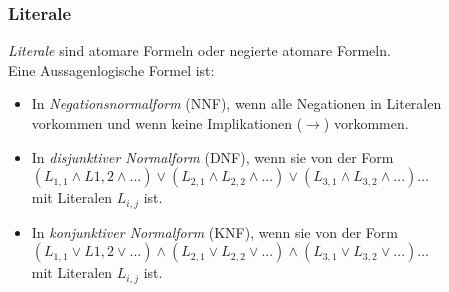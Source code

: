 \subsubsection{Literale}%
\label{ssub:literale}
\begin{minipage}{0.9\linewidth}
\textit{Literale} sind atomare Formeln oder negierte atomare Formeln. \\
Eine Aussagenlogische Formel ist:
\begin{itemize}
 \item In \textit{Negationsnormalform} (NNF), wenn alle Negationen in Literalen vorkommen und wenn keine Implikationen ($\to$) vorkommen.
 \item In \textit{disjunktiver Normalform} (DNF), wenn sie von der Form \\
 $(L_{1,1}\land L{1,2} \land ...) \lor (L_{2,1} \land L_{2,2} \land ...) \lor (L_{3,1} \land L_{3,2} \land ...)...$ \\
 mit Literalen $L_{i,j}$ ist.
 \item In \textit{konjunktiver Normalform} (KNF), wenn sie von der Form \\
 $(L_{1,1}\lor L{1,2} \lor ...) \land (L_{2,1} \lor L_{2,2} \lor ...) \land (L_{3,1} \lor L_{3,2} \lor ...)...$ \\
 mit Literalen $L_{i,j}$ ist.
\end{itemize}
\end{minipage}

